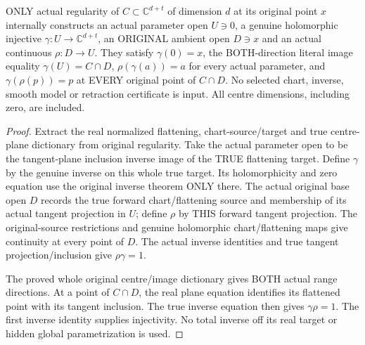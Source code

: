 \begin{theorem}
\label{hir:original-regular-centre-actual-parameter-retraction}
\leanok
ONLY actual regularity of $C\subset\mathbb C^{d+t}$ of dimension $d$ at its
original point $x$ internally constructs an actual parameter open $U\ni0$,
a genuine holomorphic injective $\gamma:U\to\mathbb C^{d+t}$, an ORIGINAL
ambient open $D\ni x$ and an actual continuous $\rho:D\to U$.
They satisfy $\gamma(0)=x$, the BOTH-direction literal image equality
$\gamma(U)=C\cap D$, $\rho(\gamma(a))=a$ for every actual parameter,
and $\gamma(\rho(p))=p$ at EVERY original point of $C\cap D$.
No selected chart, inverse, smooth model or retraction certificate is input.
All centre dimensions, including zero, are included.
\end{theorem}
\begin{proof}
Extract the real normalized flattening, chart-source/target and true
centre-plane dictionary from original regularity. Take the actual
parameter open to be the tangent-plane inclusion inverse image of the
TRUE flattening target. Define $\gamma$ by the genuine inverse on this
whole true target. Its holomorphicity and zero equation use the original
inverse theorem ONLY there. The actual original base open $D$ records the
true forward chart/flattening source and membership of its actual tangent
projection in $U$; define $\rho$ by THIS forward tangent projection.
The original-source restrictions and genuine holomorphic chart/flattening
maps give continuity at every point of $D$. The actual inverse identities
and true tangent projection/inclusion give $\rho\gamma=1$.

The proved whole original centre/image dictionary gives BOTH actual range
directions. At a point of $C\cap D$, the real plane equation identifies its
flattened point with its tangent inclusion. The true inverse equation then
gives $\gamma\rho=1$. The first inverse identity supplies injectivity.
No total inverse off its real target or hidden global parametrization is
used.
\end{proof}

